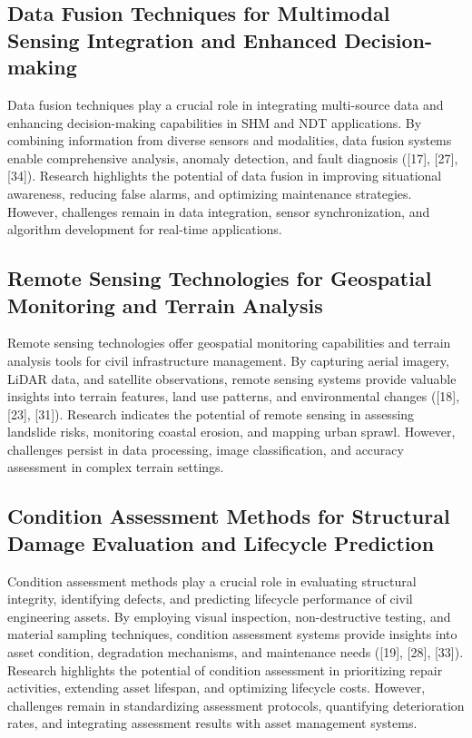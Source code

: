 \documentclass[journal, a4paper]{IEEEtran}
\begin{document}
\subsection{Data Fusion Techniques for Multimodal Sensing Integration and Enhanced Decision-making}
Data fusion techniques play a crucial role in integrating multi-source data and enhancing decision-making
capabilities in SHM and NDT applications. By combining information from diverse sensors and modalities, data fusion
systems enable comprehensive analysis, anomaly detection, and fault diagnosis ([17], [27], [34]).
Research highlights the potential of data fusion in improving situational awareness, reducing false alarms,
and optimizing maintenance strategies. However, challenges remain in data integration, sensor synchronization,
and algorithm development for real-time applications. 

\subsection{Remote Sensing Technologies for Geospatial Monitoring and Terrain Analysis}
Remote sensing technologies offer geospatial monitoring capabilities and terrain analysis tools for civil
infrastructure management. By capturing aerial imagery, LiDAR data, and satellite observations,
remote sensing systems provide valuable insights into terrain features, land use patterns, and environmental changes
([18], [23], [31]). Research indicates the potential of remote sensing in assessing landslide risks,
monitoring coastal erosion, and mapping urban sprawl. However, challenges persist in data processing,
image classification, and accuracy assessment in complex terrain settings.

\subsection{Condition Assessment Methods for Structural Damage Evaluation and Lifecycle Prediction}
Condition assessment methods play a crucial role in evaluating structural integrity, identifying defects,
and predicting lifecycle performance of civil engineering assets. By employing visual inspection, non-destructive testing,
and material sampling techniques, condition assessment systems provide insights into asset condition, degradation mechanisms,
and maintenance needs ([19], [28], [33]). Research highlights the potential of condition assessment in prioritizing repair
activities, extending asset lifespan, and optimizing lifecycle costs. However, challenges remain in standardizing assessment
protocols, quantifying deterioration rates, and integrating assessment results with asset management systems.
\end{document}
